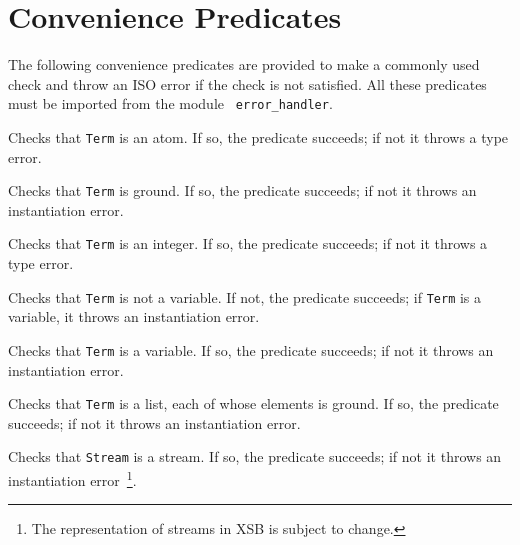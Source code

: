 \section{Convenience Predicates}

The following convenience predicates are provided to make a commonly
used check and throw an ISO error if the check is not satisfied.  All
these predicates must be imported from the module {\tt
  error\_handler}.

\begin{description}
Checks that {\tt Term} is an atom.  If so, the predicate succeeds;
if not it throws a type error.

Checks that {\tt Term} is ground.  If so, the predicate succeeds;
if not it throws an instantiation error.

Checks that {\tt Term} is an integer.  If so, the predicate succeeds;
if not it throws a type error.

Checks that {\tt Term} is not a variable.  If not, the predicate succeeds;
if {\tt Term} is a variable,  it throws an instantiation error.

Checks that {\tt Term} is a variable.  If so, the predicate succeeds;
if not it throws an instantiation error.

Checks that {\tt Term} is a list, each of whose elements is ground.
If so, the predicate succeeds; if not it throws an instantiation
error.
	    
Checks that {\tt Stream} is a stream.  If so, the predicate succeeds;
if not it throws an instantiation error~\footnote{The representation
of streams in XSB is subject to change.}.

\end{description}


